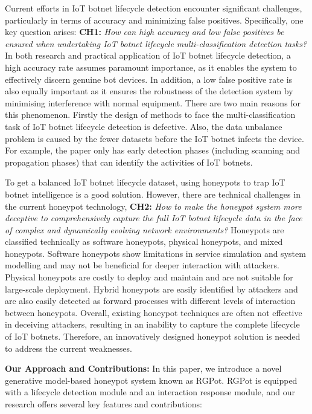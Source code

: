 \documentclass[journal]{IEEEtai}
\begin{document}
Current efforts in IoT botnet lifecycle detection encounter significant challenges, particularly in terms of accuracy and minimizing false positives. 
Specifically, one key question arises:
\textbf{CH1: }\textit{How can high accuracy and low false positives be ensured when undertaking IoT botnet lifecycle multi-classification detection tasks?}
In both research and practical application of IoT botnet lifecycle detection, a high accuracy rate assumes paramount importance, as it enables the system to effectively discern genuine bot devices. 
In addition, a low false positive rate is also equally important as it ensures the robustness of the detection system by minimising interference with normal equipment. 
There are two main reasons for this phenomenon.
Firstly the design of methods to face the multi-classification task of IoT botnet lifecycle detection is defective.
Also, the data unbalance problem is caused by the fewer datasets before the IoT botnet infects the device.
For example, the paper \cite{NGUYEN2022107525} only has early detection phases (including scanning and propagation phases) that can identify the activities of IoT botnets.

To get a balanced IoT botnet lifecycle dataset, using honeypots to trap IoT botnet intelligence is a good solution.
However, there are technical challenges in the current honeypot technology, \textbf{CH2: }\textit{How to make the honeypot system more deceptive to comprehensively capture the full IoT botnet lifecycle data in the face of complex and dynamically evolving network environments?}
Honeypots are classified technically as software honeypots, physical honeypots, and mixed honeypots.
Software honeypots show limitations in service simulation and system modelling and may not be beneficial for deeper interaction with attackers.
Physical honeypots are costly to deploy and maintain and are not suitable for large-scale deployment.
Hybrid honeypots are easily identified by attackers and are also easily detected as forward processes with different levels of interaction between honeypots.
Overall, existing honeypot techniques are often not effective in deceiving attackers, resulting in an inability to capture the complete lifecycle of IoT botnets.
Therefore, an innovatively designed honeypot solution is needed to address the current weaknesses.


\textbf{Our Approach and Contributions:} 
In this paper, we introduce a novel generative model-based honeypot system known as RGPot. 
RGPot is equipped with a lifecycle detection module and an interaction response module, and our research offers several key features and contributions:
\end{document}
